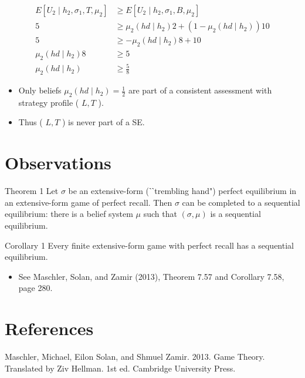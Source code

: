 \documentclass[10pt]{article}
\begin{document}
$$
\begin{aligned}
E\left[U_{2} \mid h_{2}, \sigma_{1}, T, \mu_{2}\right] & \geq E\left[U_{2} \mid h_{2}, \sigma_{1}, B, \mu_{2}\right] \\
5 & \geq \mu_{2}\left(h d \mid h_{2}\right) 2+\left(1-\mu_{2}\left(h d \mid h_{2}\right)\right) 10 \\
5 & \geq-\mu_{2}\left(h d \mid h_{2}\right) 8+10 \\
\mu_{2}\left(h d \mid h_{2}\right) 8 & \geq 5 \\
\mu_{2}\left(h d \mid h_{2}\right) & \geq \frac{5}{8}
\end{aligned}
$$

\begin{itemize}
  \item Only beliefs $\mu_{2}\left(h d \mid h_{2}\right)=\frac{1}{2}$ are part of a consistent assessment with strategy profile ( $L, T$ ).
  \item Thus ( $L, T$ ) is never part of a SE.
\end{itemize}

\section*{Observations}
Theorem 1 Let $\sigma$ be an extensive-form (ˋˋtrembling hand") perfect equilibrium in an extensive-form game of perfect recall. Then $\sigma$ can be completed to a sequential equilibrium: there is a belief system $\mu$ such that $(\sigma, \mu)$ is a sequential equilibrium.

Corollary 1 Every finite extensive-form game with perfect recall has a sequential equilibrium.

\begin{itemize}
  \item See Maschler, Solan, and Zamir (2013), Theorem 7.57 and Corollary 7.58, page 280.
\end{itemize}

\section*{References}
Maschler, Michael, Eilon Solan, and Shmuel Zamir. 2013. Game Theory. Translated by Ziv Hellman. 1st ed. Cambridge University Press.
\end{document}
